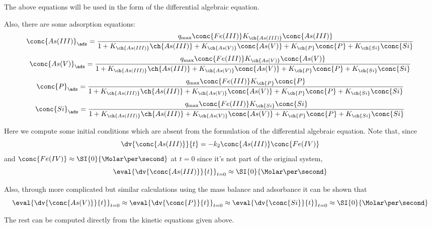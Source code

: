 \documentclass[11pt]{scrartcl} %
\begin{document}
            The above equations will be used in the form of the differential algebraic equation.

            Also, there are some adsorption equations:
            \[\conc{As (III)}_\ads = \frac{q_{\max}\conc{Fe(III)}K_{\ch{As (III)}} \conc{As(III)}}{1 + K_{\ch{As (III)}}\ch{As(III)} + K_{\ch{As (V)}}\conc{As (V)} + K_{\ch{P}}\conc{P} + K_{\ch{Si}}\conc{Si}}\]
            \[\conc{As (V)}_\ads = \frac{q_{\max}\conc{Fe(III)}K_{\ch{As (V)}} \conc{As(V)}}{1 + K_{\ch{As (III)}}\ch{As(III)} + K_{\ch{As (V)}}\conc{As (V)} + K_{\ch{P}}\conc{P} + K_{\ch{Si}}\conc{Si}}\]
            \[\conc{P}_\ads = \frac{q_{\max}\conc{Fe(III)}K_{\ch{P}} \conc{P}}{1 + K_{\ch{As (III)}}\ch{As(III)} + K_{\ch{As (V)}}\conc{As (V)} + K_{\ch{P}}\conc{P} + K_{\ch{Si}}\conc{Si}}\]
            \[\conc{Si}_\ads = \frac{q_{\max}\conc{Fe(III)}K_{\ch{Si}} \conc{Si}}{1 + K_{\ch{As (III)}}\ch{As(III)} + K_{\ch{As (V)}}\conc{As (V)} + K_{\ch{P}}\conc{P} + K_{\ch{Si}}\conc{Si}}\]

            Here we compute some initial conditions which are absent from the formulation of the differential algebraic equation. 
            Note that, since
            \[\dv{\conc{As (III)}}{t} = -k_2\conc{As (III)}\conc{Fe (IV)}\]
            and $\conc{Fe (IV)} \approx \SI{0}{\Molar\per\second}$ at $t = 0$ since it's not part of the original system,
            \[\eval{\dv{\conc{As (III)}}{t}}_{t = 0} \approx \SI{0}{\Molar\per\second}\]

            Also, through more complicated but similar calculations using the mass balance and adsorbance it can be shown that
            \[\eval{\dv{\conc{As (V)}}{t}}_{t = 0} \approx \eval{\dv{\conc{P}}{t}}_{t = 0} \approx \eval{\dv{\conc{Si}}{t}}_{t = 0} \approx \SI{0}{\Molar\per\second}\]

            The rest can be computed directly from the kinetic equations given above.
\end{document}
